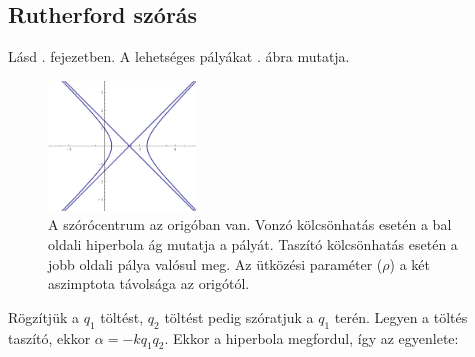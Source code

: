   \subsection{Rutherford szórás}
   
   Lásd . fejezetben. A lehetséges pályákat . ábra mutatja.
   
   \begin{figure}[ht!]
    \centering
    \includegraphics[width=0.35\textwidth]{A14tetel/palyak}
    \caption{A szórócentrum az origóban van. Vonzó kölcsönhatás esetén a bal oldali hiperbola ág mutatja a pályát. Taszító kölcsönhatás esetén a jobb oldali pálya valósul meg. Az ütközési paraméter ($\rho$) a két aszimptota távolsága az origótól.}\label{fig:A14-palyak}
   \end{figure}

   
   Rögzítjük a $q_1$ töltést, $q_2$ töltést pedig szóratjuk a $q_1$ terén. Legyen a töltés taszító, ekkor $\alpha=-k q_1 q_2$. Ekkor a hiperbola megfordul, így az egyenlete:
   
